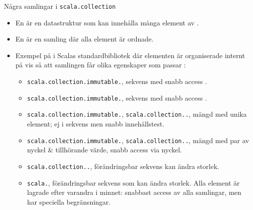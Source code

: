 \begin{Slide}{Några samlingar i \texttt{scala.collection}}\SlideFontSmall
\SlideOnly{\setlength{\leftmargini}{0pt}}
\begin{itemize}
\item En   är en datastruktur som kan innehålla många element av .
\item En   är en samling där alla element är ordnade.

\item Exempel på  i Scalas standardbibliotek där elementen är organiserade  internt på  vis så att samlingen får olika egenskaper som passar :
\begin{itemize}\SlideFontTiny
\item \texttt{scala.collection.immutable.}, sekvens med snabb access .
\item \texttt{scala.collection.immutable.}, sekvens med snabb access .
\item \texttt{scala.collection.immutable.}, \texttt{scala.collection..}, mängd med unika element; ej i sekvens men snabb innehållstest.
\item \texttt{scala.collection.immutable.}, \texttt{scala.collection..}, mängd med par av nyckel \& tillhörande värde, snabb access via nyckel.
\item \texttt{scala.collection..}, förändringsbar sekvens kan ändra storlek.
\item \texttt{scala.}, förändringsbar sekvens som  kan ändra storlek. Alla element är lagrade efter varandra i minnet: snabbast access av alla samlingar, men har speciella begränsningar.
\end{itemize}
\end{itemize}
\end{Slide}



